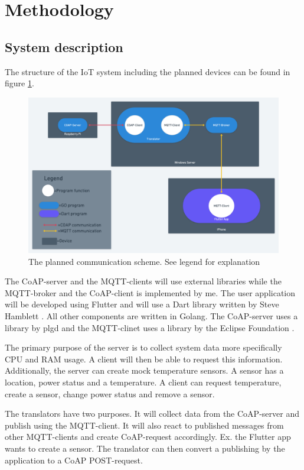 \section{Methodology}
\label{ch:method}
\noindent	

\subsection{System description}
\label{ch:method:model}
The structure of the IoT system including the planned devices can be found in figure \ref{fig:communication}. 
\begin{figure}[H]
    \centering
    \includegraphics[width=1\textwidth]{img/communication.png} 
    \caption{The planned communication scheme. See legend for explanation}
    \label{fig:communication}
\end{figure}

The CoAP-server and the MQTT-clients will use external libraries while the MQTT-broker and the CoAP-client is implemented by me. 
The user application will be developed using Flutter and will use a Dart library written by Steve Hamblett \cite{dartMqtt}. 
All other components are written in Golang. The CoAP-server uses a library by plgd\cite{goCoAP} and the MQTT-clinet uses a library by the Eclipse Foundation \cite{goMQTT}.

The primary purpose of the server is to collect system data more specifically CPU and RAM usage. A client will then be able to request this information. Additionally, the server can create mock temperature sensors. A sensor has a location, power status and a temperature. A client can request temperature, create a sensor, change power status and remove a sensor. 

The translators have two purposes. It will collect data from the CoAP-server and publish using the MQTT-client. It will also react to published messages from other MQTT-clients and create CoAP-request accordingly. Ex. the Flutter app wants to create a sensor. The translator can then convert a publishing by the application to a CoAP POST-request.

